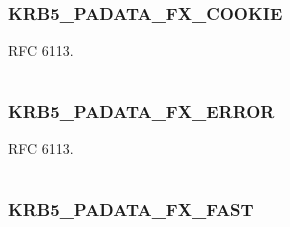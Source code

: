 \documentclass[letterpaper,10pt,english]{sphinxmanual}
\begin{document}
\subsubsection{KRB5\_PADATA\_FX\_COOKIE}
\label{appdev/refs/macros/KRB5_PADATA_FX_COOKIE:krb5-padata-fx-cookie}\label{appdev/refs/macros/KRB5_PADATA_FX_COOKIE::doc}\label{appdev/refs/macros/KRB5_PADATA_FX_COOKIE:krb5-padata-fx-cookie-data}

\begin{fulllineitems}
\label{appdev/refs/macros/KRB5_PADATA_FX_COOKIE:KRB5_PADATA_FX_COOKIE}
\end{fulllineitems}


RFC 6113.

\begin{tabulary}{\linewidth}{|L|L|}
\hline

 & 
\\
\hline\end{tabulary}



\subsubsection{KRB5\_PADATA\_FX\_ERROR}
\label{appdev/refs/macros/KRB5_PADATA_FX_ERROR:krb5-padata-fx-error}\label{appdev/refs/macros/KRB5_PADATA_FX_ERROR::doc}\label{appdev/refs/macros/KRB5_PADATA_FX_ERROR:krb5-padata-fx-error-data}

\begin{fulllineitems}
\label{appdev/refs/macros/KRB5_PADATA_FX_ERROR:KRB5_PADATA_FX_ERROR}
\end{fulllineitems}


RFC 6113.

\begin{tabulary}{\linewidth}{|L|L|}
\hline

 & 
\\
\hline\end{tabulary}



\subsubsection{KRB5\_PADATA\_FX\_FAST}
\label{appdev/refs/macros/KRB5_PADATA_FX_FAST::doc}\label{appdev/refs/macros/KRB5_PADATA_FX_FAST:krb5-padata-fx-fast}\label{appdev/refs/macros/KRB5_PADATA_FX_FAST:krb5-padata-fx-fast-data}
\end{document}
